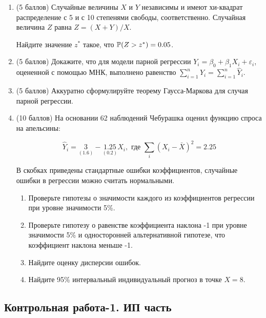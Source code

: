 \begin{enumerate}
  \item (5 баллов) Случайные величины $X$ и $Y$ независимы и имеют хи-квадрат распределение
  с 5 и с 10 степенями свободы, соответственно. Случайная величина $Z$ равна $Z = (X+Y)/X$.

  Найдите значение $z^*$ такое, что $\P(Z > z^*)=0.05$.
  \item (5 баллов) Докажите, что для модели парной регрессии $Y_i = \beta_0 + \beta_1 X_i + \varepsilon_i$,
оцененной с помощью МНК, выполнено равенство $\sum_{i=1}^n Y_i = \sum_{i=1}^n \hat Y_i$.

  \item (5 баллов) Аккуратно сформулируйте теорему Гаусса-Маркова для случая парной регрессии.

  \item (10 баллов) На основании 62 наблюдений Чебурашка оценил функцию спроса на апельсины:

 \[
 \hat Y_i = \underset{(1.6)}{3} - \underset{(0.2)}{1.25} X_i, \text{ где } \sum_i (X_i - \bar X)^2 =2.25
 \]

 В скобках приведены стандартные ошибки коэффициентов, случайные ошибки в регрессии можно считать нормальными.


  \begin{enumerate}
    \item Проверьте гипотезы о значимости каждого из коэффициентов регрессии при уровне значимости 5\%.
    \item Проверьте гипотезу о равенстве коэффициента наклона -1 при уровне значимости 5\%
    и односторонней альтернативной гипотезе, что коэффициент наклона меньше -1.
    \item Найдите оценку дисперсии ошибок.
    \item Найдите 95\% интервальный индивидуальный прогноз в точке $X=8$.
  \end{enumerate}
\end{enumerate}



\subsection{Контрольная работа-1. ИП часть}

